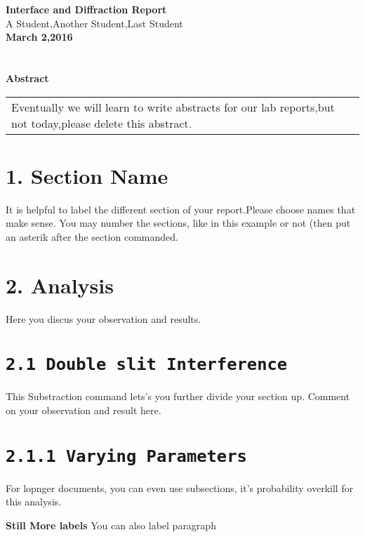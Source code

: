 \documentclass[a4paper,10pt]{article}
\begin{document}
 
\begin{center}
\textbf{\LARGE Interface and Diffraction Report}\\[0.5em]
\textsf{\LARGE A Student,Another Student,Last Student}\\
\textbf{March 2,2016}\\
\end{center}
 
\section*{}
\begin{center}
\textbf{\LARGE Abstract}
\begin{tabular}{l l}
Eventually we will learn to write abstracts for our lab reports,but not today,please delete this abstract.
\end{tabular}
\end{center}
 
\section*{1. Section Name}
It is helpful to label the different section of your report.Please choose names that make sense. You may number the sections, like in this example or not (then put an asterik after the section commanded.
 
\section*{2. Analysis}
Here you discus your observation and results.
 
\section*{\texttt{2.1 Double slit Interference}}
This Substraction command lets's you further divide your section up. Comment on your observation and result here.
 
\section*{\texttt{2.1.1 Varying Parameters}}
For lopnger documents, you can even use subsections, it's probability overkill for this analysis.

\pagestyle{empty}

\textbf{Still More labels} You can also label paragraph
\end{document}
